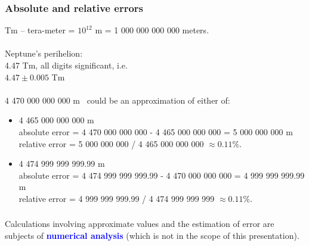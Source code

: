 \documentclass[aspectratio=169,xcolor=pdftex,dvipsnames]{beamer} %
\newcommand{\jemph}[1]{\textcolor{Blue}{\textbf{#1}}}
\begin{document}
\begin{frame}
\frametitle{Absolute and relative errors}

Tm -- tera-meter = $10^{12}$ m = 1 000 000 000 000 meters.
\\ \ \\
Neptune's perihelion: \\
4.47 Tm, all digits significant, i.e.\\
$4.47\pm 0.005$ Tm
\\ \ \\
4 470 000 000 000 m \ could be an approximation of either of:
\begin{itemize}
\item
4 465 000 000 000 m\\
absolute error = 4 470 000 000 000 - 4 465 000 000 000 = 5 000 000 000 m\\
relative error = 5 000 000 000 / 4 465 000 000 000 $\approx 0.11\%$.
\item
4 474 999 999 999.99 m\\
absolute error = 4 474 999 999 999.99 - 4 470 000 000 000 = 4 999 999 999.99 m\\
relative error = 4 999 999 999.99 / 4 474 999 999 999 $\approx 0.11\%$.
\end{itemize}

\end{frame}

\begin{frame}
\frametitle{}

Calculations involving approximate values and the estimation of error are subjects of \jemph{numerical analysis}
(which is not in the scope of this presentation).

\end{frame}


\end{document}
